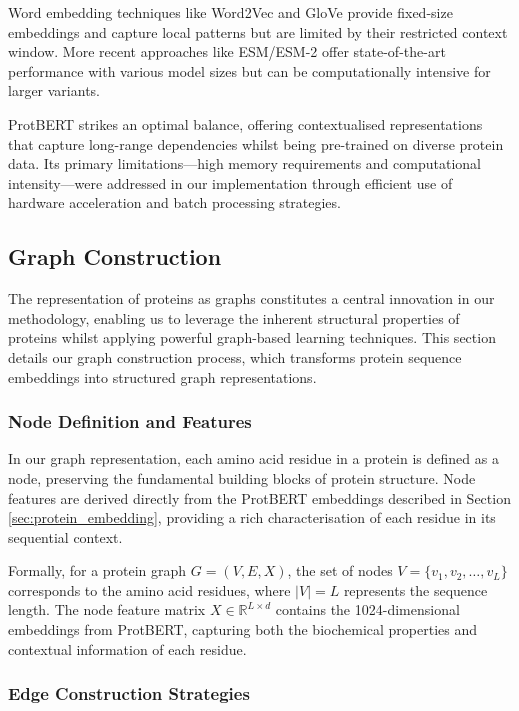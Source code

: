 \documentclass[12pt,a4paper]{article}
\begin{document}
Word embedding techniques like Word2Vec and GloVe provide fixed-size embeddings and capture local patterns but are limited by their restricted context window. More recent approaches like ESM/ESM-2 offer state-of-the-art performance with various model sizes but can be computationally intensive for larger variants.

ProtBERT strikes an optimal balance, offering contextualised representations that capture long-range dependencies whilst being pre-trained on diverse protein data. Its primary limitations—high memory requirements and computational intensity—were addressed in our implementation through efficient use of hardware acceleration and batch processing strategies.

\subsection{Graph Construction}
\label{sec:graph_construction}

The representation of proteins as graphs constitutes a central innovation in our methodology, enabling us to leverage the inherent structural properties of proteins whilst applying powerful graph-based learning techniques. This section details our graph construction process, which transforms protein sequence embeddings into structured graph representations.

\subsubsection{Node Definition and Features}

In our graph representation, each amino acid residue in a protein is defined as a node, preserving the fundamental building blocks of protein structure. Node features are derived directly from the ProtBERT embeddings described in Section \ref{sec:protein_embedding}, providing a rich characterisation of each residue in its sequential context.

Formally, for a protein graph $G = (V, E, X)$, the set of nodes $V = \{v_1, v_2, \ldots, v_L\}$ corresponds to the amino acid residues, where $|V| = L$ represents the sequence length. The node feature matrix $X \in \mathbb{R}^{L \times d}$ contains the 1024-dimensional embeddings from ProtBERT, capturing both the biochemical properties and contextual information of each residue.

\subsubsection{Edge Construction Strategies}
\end{document}
